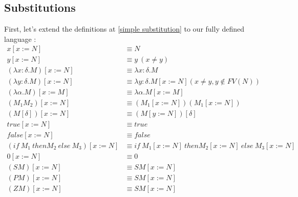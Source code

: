 \documentclass{article}
\begin{document}
    \subsection{Substitutions}
    First, let's extend the definitions at \ref{simple substitution} to our fully defined language :
    \label{substitution1}\begin{align*}
            x[x:=N] &\equiv N\\
            y[x:=N] &\equiv y \ ( x\neq y)\\
            (\lambda x : \delta.M)[x:=N] &\equiv \lambda x : \delta .M \\
            (\lambda y : \delta .M)[x:=N] &\equiv \lambda y : \delta.M[x:=N]  (x\neq y,y\not\in FV(N)) \\
            (\lambda \alpha .M)[x:=M] &\equiv \lambda \alpha .M[x:=M]\\
            (M_1 M_2)[x:=N] &\equiv (M_1[x:=N])(M_1[x:=N])\\
            (M [\delta])[x:=N] &\equiv (M[y:=N])[\delta]\\
            true[x:=N] &\equiv true\\
            false[x:=N] &\equiv false\\
            (if \ M_1 \ then M_2 \ else \ M_3)[x:=N] &\equiv if \ M_1[x:=N] \ then M_2[x:=N] \ else \ M_3[x:=N]\\
            0[x:=N] &\equiv 0\\
            (S M)[x:=N] &\equiv S M[x:=N]\\
            (P M)[x:=N] &\equiv S M[x:=N]\\
            (Z M)[x:=N] &\equiv S M[x:=N]
        \end{align*}
    
\end{document}

